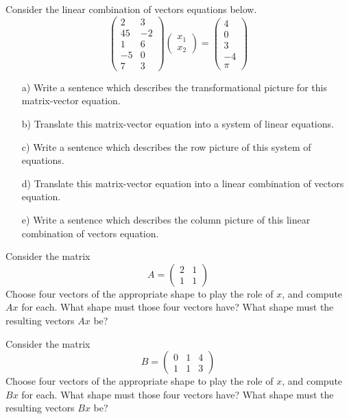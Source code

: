 \documentclass[cahier-main.tex]{subfiles}
\begin{document}
\begin{task}
Consider the linear combination of vectors equations below.
\[
\begin{pmatrix} 2 & 3 \\ 45 & -2 \\ 1 & 6 \\ -5 & 0 \\ 7 & 3\end{pmatrix}
\begin{pmatrix} x_1 \\ x_2 \end{pmatrix}
= \begin{pmatrix}4 \\ 0 \\ 3 \\ -4 \\ \pi \end{pmatrix} 
\]
\begin{itemize}
\item[a)] Write a sentence which describes the transformational picture for this matrix-vector equation.

\item[b)] Translate this matrix-vector equation into a system of linear equations. 
\item[c)] Write a sentence which describes the row picture of this system of equations.
\item[d)] Translate this matrix-vector equation into a linear combination of vectors equation.
\item[e)] Write a sentence which describes the column picture of this linear combination of vectors equation.\end{itemize}
\end{task}

\begin{task}
Consider the matrix 
\[
A = \begin{pmatrix} 2 & 1 \\ 1 & 1 \end{pmatrix}
\]
Choose four vectors of the appropriate shape to play the role of $x$, and compute $Ax$ for each. What shape must those four vectors have? What shape must the resulting vectors $Ax$ be?
\end{task}

\begin{task}
Consider the matrix 
\[
B = \begin{pmatrix} 0 & 1 & 4 \\ 1 & 1 & 3\end{pmatrix}
\]
Choose four vectors of the appropriate shape to play the role of $x$, and compute $Bx$ for each. What shape must those four vectors have? What shape must the resulting vectors $Bx$ be?
\end{task}
\end{document}
